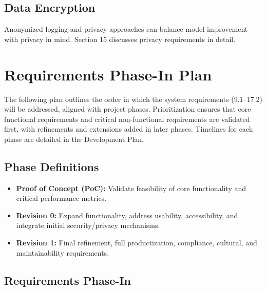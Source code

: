 \documentclass[11pt]{article}
\begin{document}
\subsection{Data Encryption}
Anonymized logging and privacy approaches can balance model improvement with privacy in mind. Section 15 discusses privacy requirements in detail.

\section{Requirements Phase-In Plan}

The following plan outlines the order in which the system requirements (9.1--17.2) will be addressed, aligned with project phases. Prioritization ensures that core functional requirements and critical non-functional requirements are validated first, with refinements and extensions added in later phases. Timelines for each phase are detailed in the Development Plan.

\subsection{Phase Definitions}

\begin{itemize}
    \item \textbf{Proof of Concept (PoC):} Validate feasibility of core functionality and critical performance metrics.
    \item \textbf{Revision 0:} Expand functionality, address usability, accessibility, and integrate initial security/privacy mechanisms.
    \item \textbf{Revision 1:} Final refinement, full productization, compliance, cultural, and maintainability requirements.
\end{itemize}

\subsection{Requirements Phase-In}
\end{document}
